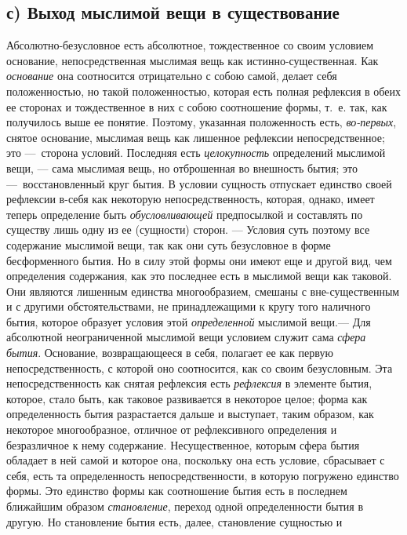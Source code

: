 \subsection[с) Выход мыслимой вещи в существование]
{с) Выход мыслимой вещи в существование}

Абсолютно-безусловное есть абсолютное,
тождественное со своим условием основание, непосредственная мыслимая вещь
как истинно-существенная. Как {\em основание} она
соотносится отрицательно с собою самой, делает себя положенностью, но такой
положенностью, которая есть полная рефлексия в обеих ее сторонах и
тождественное в них с собою соотношение формы, т.~е. так, как получилось
выше ее понятие. Поэтому, указанная положенность есть,
{\em во-первых}, снятое основание, мыслимая вещь как
лишенное рефлексии непосредственное; это —~сторона условий. Последняя есть
{\em целокупность} определений мыслимой вещи, — сама
мыслимая вещь, но отброшенная во внешность бытия; это —~восстановленный
круг бытия. В условии сущность отпускает единство своей рефлексии в-себя
как некоторую непосредственность, которая, однако, имеет теперь определение
быть {\em обусловливающей} предпосылкой и составлять по
существу лишь одну из ее (сущности) сторон. — Условия суть поэтому все
содержание мыслимой вещи, так как они суть безусловное в форме
бесформенного бытия. Но в силу этой формы они имеют еще и другой вид, чем
определения содержания, как это последнее есть в мыслимой вещи как таковой.
Они являются лишенным единства многообразием, смешаны с вне-существенным и
с другими обстоятельствами, не принадлежащими к кругу того наличного бытия,
которое образует условия этой {\em определенной}
мыслимой вещи.— Для абсолютной неограниченной мыслимой вещи условием служит
сама {\em сфера бытия}. Основание, возвращающееся в
себя, полагает ее как первую непосредственность, с которой оно соотносится,
как со своим безусловным. Эта непосредственность как снятая рефлексия есть
{\em рефлексия} в элементе бытия, которое, стало быть,
как таковое развивается в некоторое целое; форма как определенность бытия
разрастается дальше и выступает, таким образом, как некоторое
многообразное, отличное от рефлексивного определения и безразличное к нему
содержание. Несущественное, которым сфера бытия обладает в ней самой и
которое она, поскольку она есть условие, сбрасывает с себя, есть та
определенность непосредственности, в которую погружено единство формы. Это
единство формы как соотношение бытия есть в последнем ближайшим образом
{\em становление}, переход одной определенности бытия в
другую. Но становление бытия есть, далее, становление сущностью и
